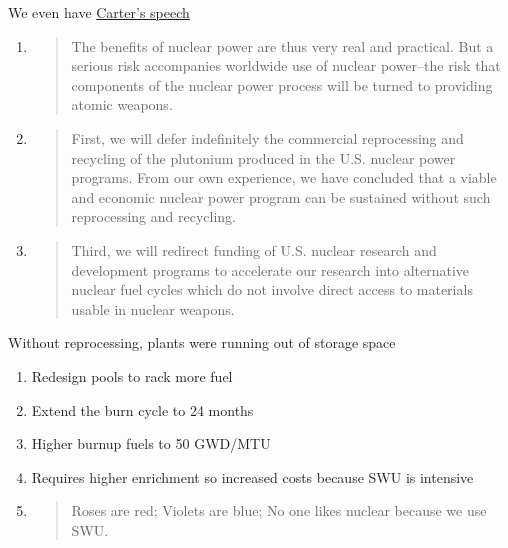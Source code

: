 \documentclass[aspectratio=1610,pdftex,dvipsnames,compress,xcolor={dvipsnames}]{beamer}
\begin{document}
\begin{frame}{We even have \href{http://www.presidency.ucsb.edu/ws/?pid=7316}{Carter's speech}}
    \begin{enumerate}[series=outerlist,topsep=0pt,itemsep=11pt,leftmargin=*,label=(\arabic*)]
        \item[]
            \begin{quote}
                The benefits of nuclear power are thus very real and practical. But a serious risk accompanies worldwide use of nuclear power--the risk that components of the nuclear power process will be turned to providing atomic weapons.
            \end{quote}
        \item[]
            \begin{quote}
                First, we will defer indefinitely the commercial reprocessing and recycling of the plutonium produced in the U.S. nuclear power programs. From our own experience, we have concluded that a viable and economic nuclear power program can be sustained without such reprocessing and recycling.
            \end{quote}
        \item[]
            \begin{quote}
                Third, we will redirect funding of U.S. nuclear research and development programs to accelerate our research into alternative nuclear fuel cycles which do not involve direct access to materials usable in nuclear weapons.
            \end{quote}
    \end{enumerate}
\end{frame}


\begin{frame}{Without reprocessing, plants were running out of storage space}
    \begin{enumerate}[series=outerlist,topsep=0pt,itemsep=21pt,leftmargin=*,label=(\arabic*)]
        \item[]Redesign pools to rack more fuel
        \item[]Extend the burn cycle to 24 months
        \item[]Higher burnup fuels to 50 GWD/MTU
        \item[]Requires higher enrichment so increased costs because SWU is intensive
        \item[]
            \begin{quote}
                Roses are red; Violets are blue; No one likes nuclear because we use SWU.
            \end{quote}
    \end{enumerate}
\end{frame}
\end{document}
